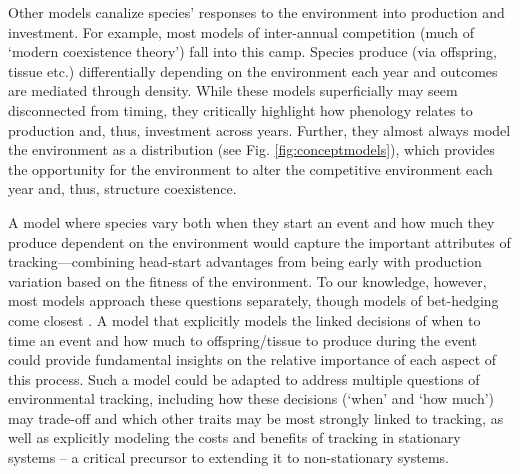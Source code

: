 \documentclass[11pt,letterpaper]{article}
\newcommand{\R}[1]{\label{#1}\linelabel{#1}}
\begin{document}
Other models canalize species' responses to the environment into production and investment. For example, most models of inter-annual competition (much of `modern coexistence theory') fall into this camp. Species produce (via offspring, tissue etc.) differentially depending on the environment each year and outcomes are mediated through density. While these models superficially may seem disconnected from timing, they critically highlight how phenology relates to production and, thus, investment across years. Further, they almost always model the environment as a distribution (see Fig. \ref{fig:conceptmodels}), which provides the opportunity for the environment to alter the competitive environment each year and, thus, structure coexistence. %

\R{whenhownewmod} A model where species vary both when they start an event and how much they produce dependent on the environment would capture the important attributes of tracking---combining head-start advantages from being early with production variation based on the fitness of the environment. To our knowledge, however, most models approach these questions separately, though models of bet-hedging come closest \citep{Gourbiere2009,tufto2015}. A model that explicitly models the linked decisions of when to time an event and how much to offspring/tissue to produce during the event could provide fundamental insights on the relative importance of each aspect of this process. Such a model could be adapted to address multiple questions of environmental tracking, including how these decisions (`when' and `how much') may trade-off and which other traits may be most strongly linked to tracking, as well as explicitly modeling the costs and benefits of tracking in stationary systems -- \R{modelcosts2}a critical precursor to extending it to non-stationary systems. \R{whenhow2end}
\end{document}
